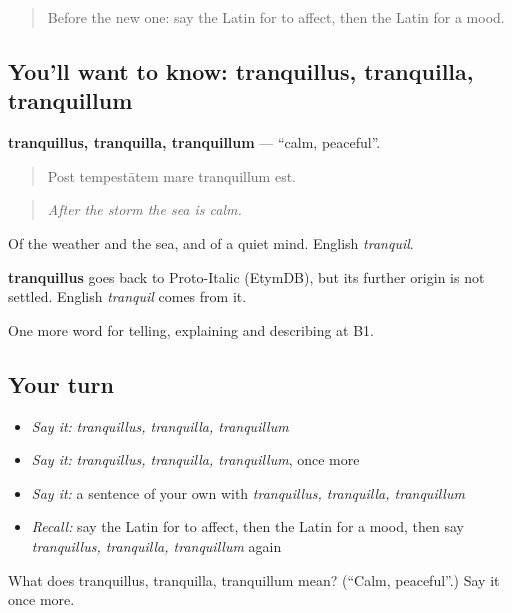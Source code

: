 \begin{quote}
Before the new one: say the Latin for to affect, then the Latin for a mood.
\end{quote}

\subsection*{You'll want to know: tranquillus, tranquilla, tranquillum}
\textbf{tranquillus, tranquilla, tranquillum} — \textquotedblleft{}calm, peaceful\textquotedblright{}.

\begin{quote}
Post tempestātem mare tranquillum est.
\end{quote}

\begin{quote}
\emph{After the storm the sea is calm.}
\end{quote}

Of the weather and the sea, and of a quiet mind. English \emph{tranquil}.

\begin{cousinweb}
\textbf{tranquillus} goes back to Proto-Italic (EtymDB), but its further origin is not settled. English \emph{tranquil} comes from it.
\end{cousinweb}

\begin{grammarlens}[title={What you've built}]
One more word for telling, explaining and describing at B1.
\end{grammarlens}

\subsection*{Your turn}
\begin{itemize}
\raggedright
  \item \emph{Say it:} \emph{tranquillus, tranquilla, tranquillum}
  \item \emph{Say it:} \emph{tranquillus, tranquilla, tranquillum}, once more
  \item \emph{Say it:} a sentence of your own with \emph{tranquillus, tranquilla, tranquillum}
  \item \emph{Recall:} say the Latin for to affect, then the Latin for a mood, then say \emph{tranquillus, tranquilla, tranquillum} again
\end{itemize}

\begin{tcolorbox}[breakable,colback=teal!4,colframe=teal!35!black,title={Before you move on}]
What does tranquillus, tranquilla, tranquillum mean? (\textquotedblleft{}Calm, peaceful\textquotedblright{}.) Say it once more.
\end{tcolorbox}
